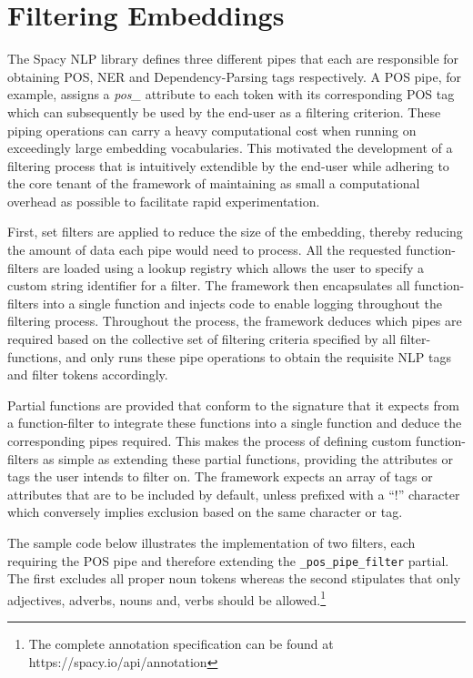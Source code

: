 \documentclass[12pt, a4paper]{report}
\theoremstyle{definition}
\theoremstyle{definition}%
\theoremstyle{definition}%
\theoremstyle{definition}%
\theoremstyle{definition}%
\theoremstyle{definition}%
\begin{document}
\section{Filtering Embeddings} \label{sec:filtering_embeddings}
The Spacy NLP library defines three different pipes that each are responsible for obtaining POS, NER and Dependency-Parsing tags respectively. A POS pipe, for example, assigns a \textit{pos\_} attribute to each token with its corresponding POS tag which can subsequently be used by the end-user as a filtering criterion. These piping operations can carry a heavy computational cost when running on exceedingly large embedding vocabularies. This motivated the development of a filtering process that is intuitively extendible by the end-user while adhering to the core tenant of the framework of maintaining as small a computational overhead as possible to facilitate rapid experimentation.

First, set filters are applied to reduce the size of the embedding, thereby reducing the amount of data each pipe would need to process. All the requested function-filters are loaded using a lookup registry which allows the user to specify a custom string identifier for a filter. The framework then encapsulates all function-filters into a single function and injects code to enable logging throughout the filtering process. Throughout the process, the framework deduces which pipes are required based on the collective set of filtering criteria specified by all filter-functions, and only runs these pipe operations to obtain the requisite NLP tags and filter tokens accordingly.

Partial functions are provided that conform to the signature that it expects from a function-filter to integrate these functions into a single function and deduce the corresponding pipes required. This makes the process of defining custom function-filters as simple as extending these partial functions, providing the attributes or tags the user intends to filter on. The framework expects an array of tags or attributes that are to be included by default, unless prefixed with a \enquote{!} character which conversely implies exclusion based on the same character or tag. 

The sample code below illustrates the implementation of two filters, each requiring the POS pipe and therefore extending the \texttt{\_pos\_pipe\_filter} partial. The first excludes all proper noun tokens whereas the second stipulates that only adjectives, adverbs, nouns and, verbs should be allowed.\footnote{The complete annotation specification can be found at https://spacy.io/api/annotation} 
\end{document}
